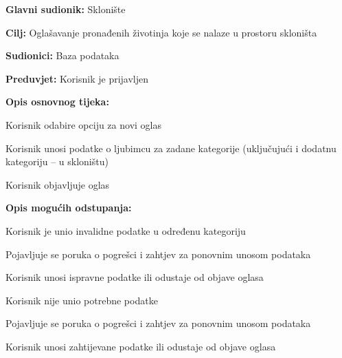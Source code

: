					\pagebreak
					\noindent {}
					\begin{packed_item}
						
						\item \textbf{Glavni sudionik: }Sklonište
						\item  \textbf{Cilj:} Oglašavanje pronađenih životinja koje se nalaze u prostoru skloništa
						\item  \textbf{Sudionici:} Baza podataka
						\item  \textbf{Preduvjet:} Korisnik je prijavljen
						\item  \textbf{Opis osnovnog tijeka:}
						
						\item[] \begin{packed_enum}
							
							\item Korisnik odabire opciju za novi oglas
							\item Korisnik unosi podatke o ljubimcu za zadane kategorije (uključujući i dodatnu kategoriju – u skloništu)
							\item Korisnik objavljuje oglas
						\end{packed_enum}
						
						\item  \textbf{Opis mogućih odstupanja:}
						
						\item[] \begin{packed_item}
							
							\item[2.a] Korisnik je unio invalidne podatke u određenu kategoriju
							\item[] \begin{packed_enum}
								
								\item Pojavljuje se poruka o pogrešci i zahtjev za ponovnim unosom podataka
								\item Korisnik unosi ispravne podatke ili odustaje od objave oglasa
								
							\end{packed_enum}
							\item[2.b] Korisnik nije unio potrebne podatke
							\item[] \begin{packed_enum}
								
								\item Pojavljuje se poruka o pogrešci i zahtjev za ponovnim unosom podataka
								\item Korisnik unosi zahtijevane podatke ili odustaje od objave oglasa
								
							\end{packed_enum}
						\end{packed_item}
					\end{packed_item}
					
